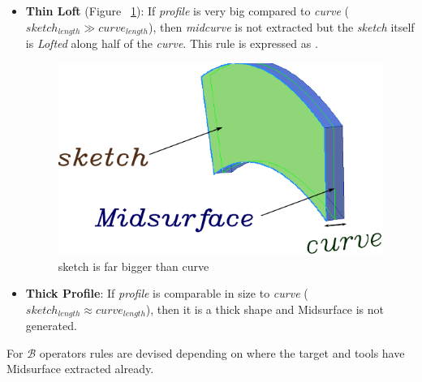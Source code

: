 \begin{itemize}[noitemsep,topsep=2pt,parsep=2pt,partopsep=2pt,label={},leftmargin=*]
\begin{itemize}
\item {\bf Thin Loft} (Figure ~\ref{figure_MidsurfSmallCurve}): If {\em profile} is very big compared to {\em curve} ($sketch_{length} \gg curve_{length}$), then {\em midcurve} is not extracted  but the {\em sketch} itself is {\em Lofted} along half of the {\em curve}. This rule is expressed as .
\begin{figure}[htbp]
\begin{center}
\includegraphics[scale=0.40]{../Common/images//MidsurfSmallCurve.pdf}
\end{center}
\caption{sketch is far bigger than curve}
\label{figure_MidsurfSmallCurve}
\end{figure}

\item {\bf Thick Profile}:   If {\em profile} is comparable in size to {\em curve}  ($sketch_{length} \approx curve_{length}$), then it is a thick shape and Midsurface is not generated.
\end{itemize}
\end{itemize}



For {\bf $\mathcal{B}$} operators rules are devised depending on where the target and tools have Midsurface extracted already.


